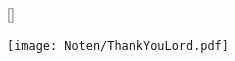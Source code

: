 []

\markboth{\songtitle}{\songtitle}

\beginverse
\endverse

\centering\texttt{[image: Noten/ThankYouLord.pdf]}

\endsong

\beginscripture

\endscripture

\begin{intersong}

\end{intersong}